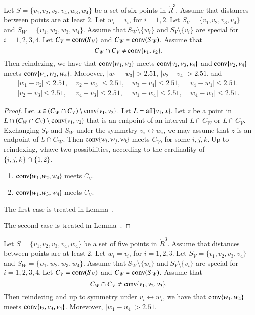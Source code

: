 \newpage

\begin{lemma}
Let $S=\{v_1,v_2,v_3,v_4,w_3,w_4\}$ be a set of six points in $\ring{R}^3$.
Assume that distances between points are at least $2$.
Let $w_i=v_i$, for $i=1,2$.  Let $S_V=\{v_1,v_2,v_3,v_4\}$
and $S_W=\{w_1,w_2,w_3,w_4\}$. 
Assume that $S_W\setminus \{w_i\}$ and $S_V\setminus\{v_i\}$
are special for $i=1,2,3,4$.
 Let $C_V = {\operatorname{conv}}(S_V)$ and
$C_W={\operatorname{conv}}(S_W)$.  Assume that 
   $$
   C_W \cap C_V \ne {\operatorname{conv}}\{v_1,v_2\}.
   $$
Then reindexing,
we have that ${\operatorname{conv}}\{w_1,w_3\}$ meets ${\operatorname{conv}}\{v_2,v_3,v_4\}$
and ${\operatorname{conv}}\{v_2,v_4\}$ meets ${\operatorname{conv}}\{w_1,w_3,w_4\}$.  Moroever,
$|w_1-w_3|>2.51$, $|v_2-v_4|>2.51$,
and
  $$
  \begin{array}{llll}
  |w_1-v_2|\le 2.51,&|v_2-w_3|\le 2.51,& |w_3-v_4|\le 2.51,&
  |v_4-w_1|\le 2.51.\\
  |v_2-v_3|\le 2.51,&|v_4-v_3|\le 2.51,& |w_1-w_4|\le 2.51,&
  |w_4-w_3|\le 2.51.
  \end{array}
  $$
\end{lemma}

\begin{proof}
Let $x\in (C_W\cap C_V)\setminus {\operatorname{conv}}\{v_1,v_2\}$.
Let $L={\operatorname{aff}}\{v_1,x\}$.  Let $z$ be a point in 
$L\cap (C_W\cap C_V)\setminus{\operatorname{conv}}\{v_1,v_2\}$ that is
an endpoint of an interval $L\cap C_W$ or $L\cap C_V$.   Exchanging
$S_V$ and $S_W$ under the symmetry $v_i\leftrightarrow w_i$,
we may assume that $z$ is an endpoint of $L\cap C_W$.  
Then ${\operatorname{conv}}\{w_i,w_j,w_k\}$ meets $C_V$, for some $i,j,k$.
Up to reindexing, 
whave two possibilities, according to the cardinality of
$\{i,j,k\}\cap\{1,2\}$.
\begin{enumerate}
  \item ${\operatorname{conv}}\{w_1,w_2,w_4\}$ meets $C_V$.
  \item ${\operatorname{conv}}\{w_1,w_3,w_4\}$ meets $C_V$.
\end{enumerate}

The first case is treated in Lemma~.

The second case is treated in Lemma~.
\end{proof}




\newpage

\begin{lemma}
Let $S=\{v_1,v_2,v_3,v_4,w_4\}$ be a set of five points in $\ring{R}^3$.
Assume that distances between points are at least $2$.
Let $w_i=v_i$, for $i=1,2,3$.  Let $S_V=\{v_1,v_2,v_3,v_4\}$
and $S_W=\{w_1,w_2,w_3,w_4\}$. 
Assume that $S_W\setminus \{w_i\}$ and $S_V\setminus\{v_i\}$
are special for $i=1,2,3,4$.
 Let $C_V = {\operatorname{conv}}(S_V)$ and
$C_W={\operatorname{conv}}(S_W)$.  Assume that 
   $$
   C_W \cap C_V \ne {\operatorname{conv}}\{v_1,v_2,v_3\}.
   $$
Then reindexing and up to symmetry under $v_i\leftrightarrow w_i$,
we have that ${\operatorname{conv}}\{w_1,w_4\}$ meets ${\operatorname{conv}}\{v_2,v_3,v_4\}$.
Morevover, $|w_1-w_4|>2.51$.
\end{lemma}

